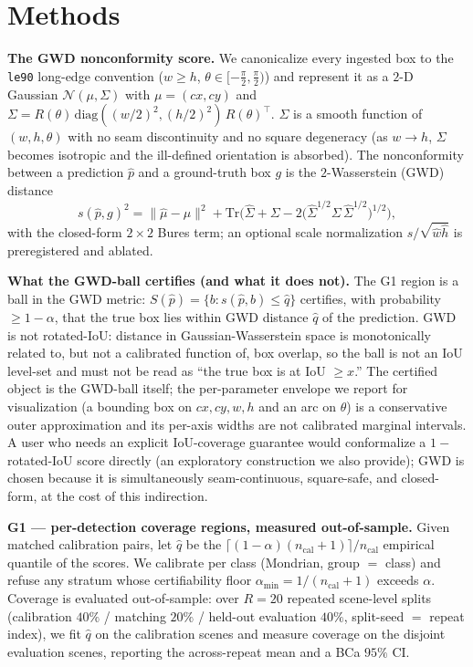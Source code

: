 \documentclass[11pt]{article}
\begin{document}
\section{Methods}\label{sec:methods}
\textbf{The GWD nonconformity score.} We canonicalize every ingested box to the \texttt{le90} long-edge
convention ($w\ge h$, $\theta\in[-\tfrac{\pi}{2},\tfrac{\pi}{2})$) and represent it as a $2$-D Gaussian
$\mathcal{N}(\mu,\Sigma)$ with $\mu=(cx,cy)$ and $\Sigma = R(\theta)\,\mathrm{diag}((w/2)^2,(h/2)^2)\,
R(\theta)^\top$. $\Sigma$ is a smooth function of $(w,h,\theta)$ with no seam discontinuity and no
square degeneracy (as $w\to h$, $\Sigma$ becomes isotropic and the ill-defined orientation is absorbed). The
nonconformity between a prediction $\hat p$ and a ground-truth box $g$ is the $2$-Wasserstein (GWD) distance
\[
s(\hat p, g)^2 = \lVert \hat\mu-\mu \rVert^2 + \mathrm{Tr}\!\Big(\hat\Sigma+\Sigma-2\big(\hat\Sigma^{1/2}
\Sigma\,\hat\Sigma^{1/2}\big)^{1/2}\Big),
\]
with the closed-form $2\times 2$ Bures term; an optional scale normalization $s/\sqrt{\hat w \hat h}$ is
preregistered and ablated.

\textbf{What the GWD-ball certifies (and what it does not).} The G1 region is a ball in the GWD metric:
$S(\hat p)=\{b: s(\hat p,b)\le\hat q\}$ certifies, with probability $\ge 1-\alpha$, that the true box lies
within GWD distance $\hat q$ of the prediction. GWD is not rotated-IoU: distance in Gaussian-Wasserstein
space is monotonically related to, but not a calibrated function of, box overlap, so the ball is not an
IoU level-set and must not be read as ``the true box is at IoU $\ge x$.'' The certified object is the GWD-ball
itself; the per-parameter envelope we report for visualization (a bounding box on $cx,cy,w,h$ and an arc on
$\theta$) is a conservative outer approximation and its per-axis widths are not calibrated marginal
intervals. A user who needs an explicit IoU-coverage guarantee would conformalize a $1-$rotated-IoU score
directly (an exploratory construction we also provide); GWD is chosen because it is simultaneously
seam-continuous, square-safe, and closed-form, at the cost of this indirection.

\textbf{G1 --- per-detection coverage regions, measured out-of-sample.} Given matched calibration pairs, let
$\hat q$ be the $\lceil(1-\alpha)(n_{\mathrm{cal}}+1)\rceil/n_{\mathrm{cal}}$ empirical quantile of the scores.
We calibrate per class (Mondrian, group $=$ class) and refuse any stratum whose certifiability floor
$\alpha_{\min}=1/(n_{\mathrm{cal}}+1)$ exceeds $\alpha$. Coverage is evaluated out-of-sample: over
$R{=}20$ repeated scene-level splits (calibration $40\%$ / matching $20\%$ / held-out evaluation $40\%$,
split-seed $=$ repeat index), we fit $\hat q$ on the calibration scenes and measure
coverage on the disjoint evaluation scenes, reporting the across-repeat mean and a BCa $95\%$ CI.
\end{document}
